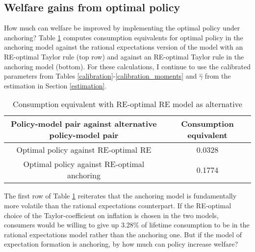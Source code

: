 \documentclass[11pt]{article}
\renewcommand{\[}{\begin{equation}}
\renewcommand{\]}{\end{equation}}
\begin{document}
\subsection{Welfare gains from optimal policy}\label{welfare}

How much can welfare be improved by implementing the optimal policy under anchoring? 
Table \ref{table_welfare} computes consumption equivalents for optimal policy in the anchoring model against the rational expectations version of the model with an RE-optimal Taylor rule (top row) and against an RE-optimal Taylor rule in the anchoring model (bottom). For these calculations, I continue to use the calibrated parameters from Tables \ref{calibration}-\ref{calibration_moments} and $\hat{\gamma}$ from the estimation in Section \ref{estimation}.

\begin{center}
\begin{table}[h!]
\begin{tabular}{ c | c}
 Policy-model pair against alternative policy-model pair& Consumption equivalent \\  \hline
Optimal policy against RE-optimal RE & 0.0328 \\  \hline  
Optimal policy against RE-optimal anchoring  & 0.1774 \\  \hline  
\end{tabular}     
      \caption{Consumption equivalent with RE-optimal RE model as alternative }  
      \label{table_welfare}
 \end{table}
\end{center}

The first row of Table \ref{table_welfare} reiterates that the anchoring model is fundamentally more volatile than the rational expectations counterpart. If the RE-optimal choice of the Taylor-coefficient on inflation is chosen in the two models, consumers would be willing to give up 3.28\% of lifetime consumption to be in the rational expectations model rather than the anchoring one. But if the model of expectation formation is anchoring, by how much can policy increase welfare?
\end{document}
